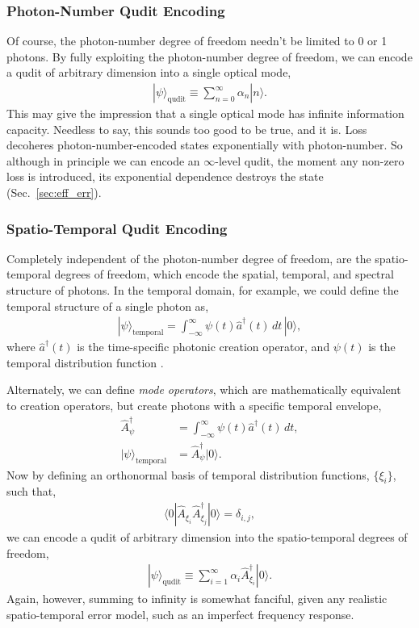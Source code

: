 \documentclass[aps,rmp,twocolumn,amsmath,amssymb,nofootinbib,superscriptaddress]{revtex4}
\newcommand{\bra}[1]{\langle#1|}
\newcommand{\ket}[1]{|#1\rangle}
\begin{document}
%
%

\subsubsection{Photon-Number Qudit Encoding}

Of course, the photon-number degree of freedom needn't be limited to 0 or 1 photons. By fully exploiting the photon-number degree of freedom, we can encode a qudit of arbitrary dimension into a single optical mode,
\begin{align} \label{eq:number_qudit}
\ket\psi_\mathrm{qudit} \equiv \sum_{n=0}^\infty \alpha_n \ket{n}.
\end{align}
This may give the impression that a single optical mode has infinite information capacity. Needless to say, this sounds too good to be true, and it is. Loss decoheres photon-number-encoded states exponentially with photon-number. So although in principle we can encode an $\infty$-level qudit, the moment any non-zero loss is introduced, its exponential dependence destroys the state (Sec.~\ref{sec:eff_err}).

%
%

\subsubsection{Spatio-Temporal Qudit Encoding}

Completely independent of the photon-number degree of freedom, are the spatio-temporal degrees of freedom, which encode the spatial, temporal, and spectral structure of photons. In the temporal domain, for example, we could define the temporal structure of a single photon as,
\begin{align}
\ket\psi_\mathrm{temporal} = \int_{-\infty}^\infty \psi(t) \hat{a}^\dag(t)\,dt\,\ket{0},
\end{align}
where $\hat{a}^\dag(t)$ is the time-specific photonic creation operator, and $\psi(t)$ is the temporal distribution function \cite{???}.

Alternately, we can define \emph{mode operators}, which are mathematically equivalent to creation operators, but create photons with a specific temporal envelope,
\begin{align}
\hat{A}^\dag_\psi &= \int_{-\infty}^\infty \psi(t) \hat{a}^\dag(t)\,dt, \nonumber \\
\ket\psi_\mathrm{temporal} &= \hat{A}^\dag_\psi \ket{0}.
\end{align}
Now by defining an orthonormal basis of temporal distribution functions, $\{\xi_i\}$, such that,
\begin{align}
\bra{0} \hat{A}_{\xi_i} \hat{A}^\dag_{\xi_j}\ket{0} = \delta_{i,j},
\end{align}
we can encode a qudit of arbitrary dimension into the spatio-temporal degrees of freedom,
\begin{align}
\ket\psi_\mathrm{qudit} \equiv \sum_{i=1}^\infty \alpha_i \hat{A}^\dag_{\xi_i} \ket{0}.
\end{align}
Again, however, summing to infinity is somewhat fanciful, given any realistic spatio-temporal error model, such as an imperfect frequency response.
\end{document}
